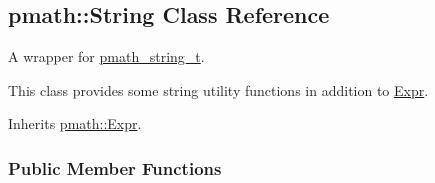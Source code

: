 \hypertarget{classpmath_1_1_string}{
\subsection{pmath::String Class Reference}
\label{classpmath_1_1_string}
}
A wrapper for \hyperlink{classpmath__string__t}{pmath\_\-string\_\-t}.

This class provides some string utility functions in addition to \hyperlink{classpmath_1_1_expr}{Expr}.  


Inherits \hyperlink{classpmath_1_1_expr}{pmath::Expr}.

\subsubsection*{Public Member Functions}
